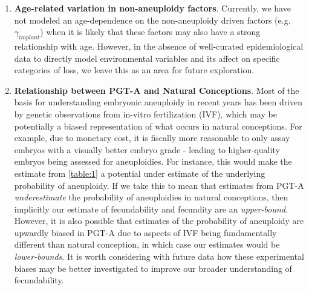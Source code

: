 \documentclass{article}
\begin{document}
\begin{enumerate}
\item \textbf{Age-related variation in non-aneuploidy factors}. Currently, we have not modeled an age-dependence on the non-aneuploidy driven factors (e.g. $\gamma_{implant}$) when it is likely that these factors may also have a strong relationship with age. However, in the absence of well-curated epidemiological data to directly model environmental variables and its affect on specific categories of loss, we leave this as an area for future exploration.  
\item \textbf{Relationship between PGT-A and Natural Conceptions}. Most of the basis for understanding embryonic aneuploidy in recent years has been driven by genetic observations from in-vitro fertilization (IVF), which may be potentially a biased representation of what occurs in natural conceptions. For example, due to monetary cost, it is fiscally more reasonable to only assay embryos with a visually better embryo grade - leading to higher-quality embryos being assessed for aneuploidies. For instance, this would make the estimate from \ref{table:1} a potential under estimate of the underlying probability of aneuploidy. If we take this to mean that estimates from PGT-A \textit{underestimate} the probability of aneuploidies in natural conceptions, then implicitly our estimate of fecundability and fecundity are an \textit{upper-bound}. However, it is also possible that estimates of the probability of aneuploidy are upwardly biased in PGT-A due to aspects of IVF being fundamentally different than natural conception, in which case our estimates would be \textit{lower-bounds}. It is worth considering with future data how these experimental biases may be better investigated to improve our broader understanding of fecundability.
\end{enumerate}





\end{document}
